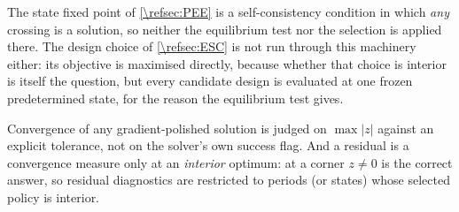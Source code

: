 The state fixed point of \cref{\refsec:PEE} is a self-consistency condition in which \emph{any} crossing is a solution, so neither the equilibrium test nor the selection is applied there. The design choice of \cref{\refsec:ESC} is not run through this machinery either: its objective is maximised directly, because whether that choice is interior is itself the question, but every candidate design is evaluated at one frozen predetermined state, for the reason the equilibrium test gives.

Convergence of any gradient-polished solution is judged on $\max\left|z\right|$ against an explicit tolerance, not on the solver's own success flag. And a residual is a convergence measure only at an \emph{interior} optimum: at a corner $z\neq 0$ is the correct answer, so residual diagnostics are restricted to periods (or states) whose selected policy is interior.
